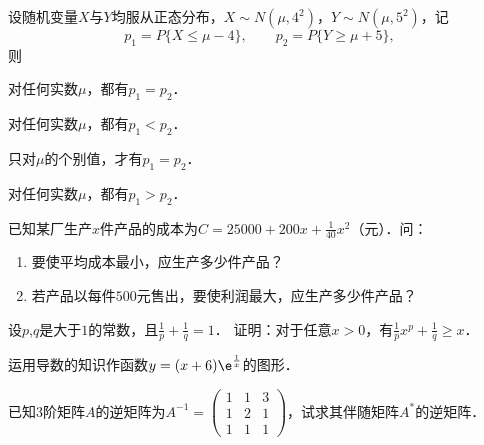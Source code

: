 \documentclass[plain,noanswer,medmath]{../../template/jnuexam}
\begin{document}
\begin{problem}
设随机变量$X$与$Y$均服从正态分布，$X\sim N(\mu ,4^2)$，$Y\sim N(\mu ,5^2)$，记
$$p_1 = P\{X \le \mu - 4\},\qquad p_2 = P\{Y \ge \mu + 5\},$$
则\pickout{}
\begin{abcd}
\item 对任何实数$\mu$，都有$p_1 = p_2$．		
\item 对任何实数$\mu$，都有$p_1 < p_2$．
\item 只对$\mu$的个别值，才有$p_1 = p_2$．	
\item 对任何实数$\mu$，都有$p_1 > p_2$．
\end{abcd}
\end{problem}









\begin{problem}
已知某厂生产$x$件产品的成本为$C = 25000 + 200x + \frac{1}{40}x^2$（元）．问：
\begin{enumerate}
\item 要使平均成本最小，应生产多少件产品？
\item 若产品以每件$500$元售出，要使利润最大，应生产多少件产品？
\end{enumerate}
\end{problem}



\begin{problem}
设$p$,$q$是大于$1$的常数，且$\frac{1}{p} + \frac{1}{q} = 1$．
证明：对于任意$x > 0$，有$\frac{1}{p} x^p + \frac{1}{q} \ge x$．
\end{problem}



\begin{problem}
运用导数的知识作函数$y = (x + 6)\e^{\frac{1}{x}}$的图形．
\end{problem}



\begin{problem}
已知$3$阶矩阵$A$的逆矩阵为$A^{-1} = \begin{pmatrix}
 1&1&3 \\
 1&2&1 \\
 1&1&1
\end{pmatrix}$，试求其伴随矩阵$A^*$的逆矩阵．
\end{problem}
\end{document}
